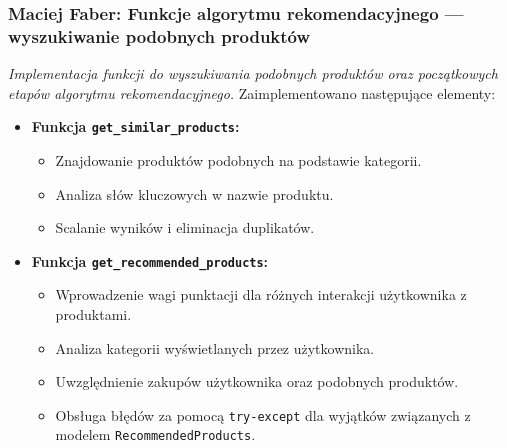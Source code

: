 \documentclass[12pt,a4paper,oneside]{article}
\theoremstyle{definition}
\numberwithin{equation}{section}
\begin{document}
\subsubsection{Maciej Faber: Funkcje algorytmu rekomendacyjnego — wyszukiwanie podobnych produktów}
\label{section:1.3.51}
\textit{
Implementacja funkcji do wyszukiwania podobnych produktów oraz początkowych etapów algorytmu rekomendacyjnego.
}
Zaimplementowano następujące elementy:
\begin{itemize}
    \item \textbf{Funkcja \texttt{get\_similar\_products}:}
    \begin{itemize}
        \item Znajdowanie produktów podobnych na podstawie kategorii.
        \item Analiza słów kluczowych w nazwie produktu.
        \item Scalanie wyników i eliminacja duplikatów.
    \end{itemize}
    \item \textbf{Funkcja \texttt{get\_recommended\_products}:}
    \begin{itemize}
        \item Wprowadzenie wagi punktacji dla różnych interakcji użytkownika z produktami.
        \item Analiza kategorii wyświetlanych przez użytkownika.
        \item Uwzględnienie zakupów użytkownika oraz podobnych produktów.
        \item Obsługa błędów za pomocą \texttt{try-except} dla wyjątków związanych z modelem \texttt{RecommendedProducts}.
    \end{itemize}
\end{itemize}
\end{document}
